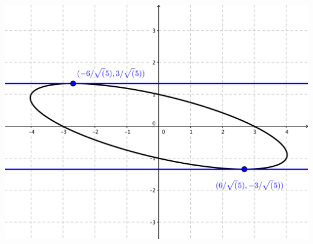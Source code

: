 \documentclass[nooutcomes,handout]{ximera}
\begin{document}
\begin{problem}
\begin{enumerate}
\begin{freeResponse}
		\begin{image}
\includegraphics[scale=.6]{figure3.png}
\end{image}		
		
		\end{freeResponse}
		
		
		
	\end{enumerate}
			
			
	
\end{problem}
\end{document}
